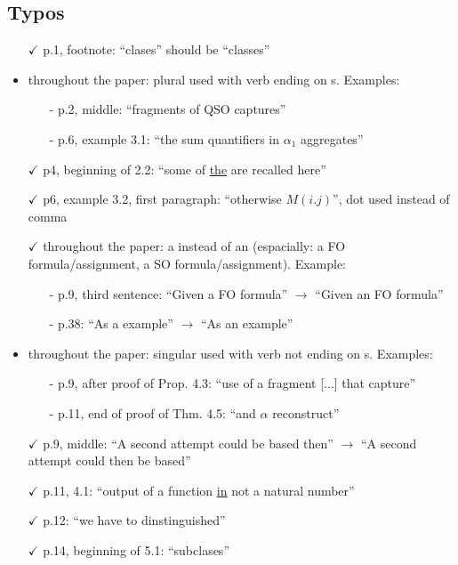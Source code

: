 \documentclass[a4paper]{article}
\begin{document}
\subsection*{Typos}
\begin{itemize}
	\setlength\itemsep{0.5em}
	\item[$\checkmark$] p.1, footnote: ``clases'' should be ``classes''
	\item throughout the paper: plural used with verb ending on s. Examples:
	\begin{itemize}
	\item[-] p.2, middle: ``fragments of QSO captures''
	\item[-] p.6, example 3.1: ``the sum quantifiers in $\alpha_1$ aggregates''
	\end{itemize}
	\item[$\checkmark$] p4, beginning of 2.2: ``some of \underline{the} are recalled here''
	\item[$\checkmark$] p6, example 3.2, first paragraph: ``otherwise $M(i.j)$'', dot used instead of comma
	\item[$\checkmark$] throughout the paper: a instead of an (espacially: a FO formula/assignment, a SO formula/assignment).
	Example:
	\begin{itemize}
		\item[-] p.9, third sentence: ``Given a FO formula'' $\to$ ``Given an FO formula''
	\item[-] p.38: ``As a example'' $\to$ ``As an example''
\end{itemize}
	\item throughout the paper: singular used with verb not ending on s. Examples:
	\begin{itemize}
	\item[-] p.9, after proof of Prop. 4.3: ``use of a fragment [...] that capture''
	\item[-] p.11, end of proof of Thm. 4.5: ``and $\alpha$ reconstruct''
\end{itemize}
	\item[$\checkmark$] p.9, middle: ``A second attempt could be based then'' $\to$ ``A second attempt could then be
	based''
	\item[$\checkmark$] p.11, 4.1: ``output of a function \underline{in} not a natural number''
	\item[$\checkmark$] p.12: ``we have to dinstinguished''
	\item[$\checkmark$] p.14, beginning of 5.1: ``subclases''

\end{itemize}
\end{document}
